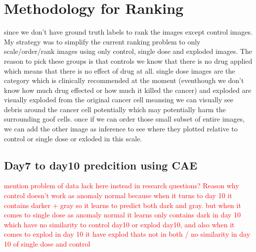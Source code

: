 \chapter{Methodology for Ranking}\label{ch:Methodology for Ranking}
 
since we don't have ground truth labels to rank the images except control images.
My strategy was to simplify the current ranking problem to only scale/order/rank images 
using only control, single dose and exploded images.
The reason to pick these groups is that controls we know that there is no drug applied which means that there is no effect of drug at all. 
single dose images are the category which is clinically recommended at the moment (eventhough we don't know how much drug effected or how 
much it killed the cancer) 
and exploded are visually exploded from the original cancer cell meansing we can visually see debris around the cancer cell potentially which
 may potentially harm the surrounding goof cells.
once if we can order those small subset of entire images, we can add the other image as inference to see where they plotted relative to 
control 
or single dose or exloded in this scale.

\section{Day7 to day10 predcition using CAE} \label{subsec:day7-to-day10}


\textcolor{red}{mention problem of data lack here instead in research questions?}
\textcolor{red}{Reason why control doesn't work as anomaly normal because when it turns to day 10 it contains darker + gray so it learns to predict both dark and gray. but when it comes to single dose as anomaly normal it learns only contains dark in day 10 which have no similarity to control day10 or explod day10, and also when it comes to explod in day 10 it have explod thats not in both / no similarity in day 10 of single dose and control}

